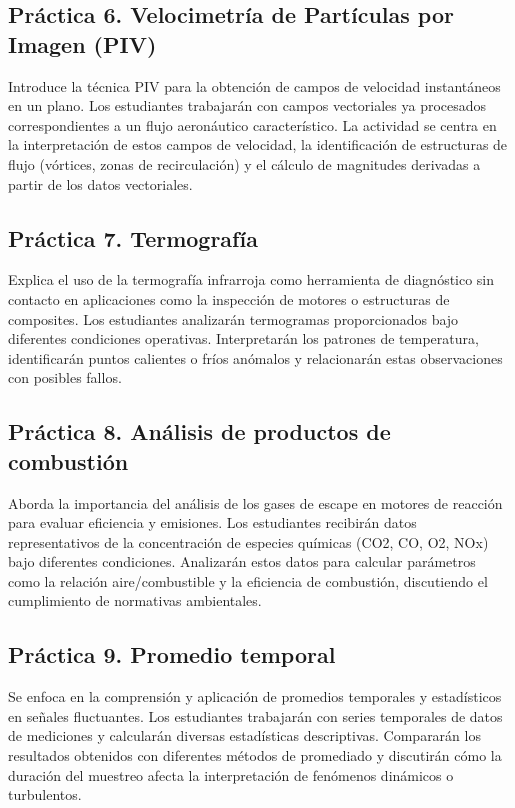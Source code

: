 \documentclass[11pt, a4paper]{article}
\begin{document}
\subsection{Práctica 6. Velocimetría de Partículas por Imagen (PIV)}
Introduce la técnica PIV para la obtención de campos de velocidad instantáneos en un plano. Los estudiantes trabajarán con campos vectoriales ya procesados correspondientes a un flujo aeronáutico característico. La actividad se centra en la interpretación de estos campos de velocidad, la identificación de estructuras de flujo (vórtices, zonas de recirculación) y el cálculo de magnitudes derivadas a partir de los datos vectoriales.

\subsection{Práctica 7. Termografía}
Explica el uso de la termografía infrarroja como herramienta de diagnóstico sin contacto en aplicaciones como la inspección de motores o estructuras de composites. Los estudiantes analizarán termogramas proporcionados bajo diferentes condiciones operativas. Interpretarán los patrones de temperatura, identificarán puntos calientes o fríos anómalos y relacionarán estas observaciones con posibles fallos.

\subsection{Práctica 8. Análisis de productos de combustión}
Aborda la importancia del análisis de los gases de escape en motores de reacción para evaluar eficiencia y emisiones. Los estudiantes recibirán datos representativos de la concentración de especies químicas (CO2, CO, O2, NOx) bajo diferentes condiciones. Analizarán estos datos para calcular parámetros como la relación aire/combustible y la eficiencia de combustión, discutiendo el cumplimiento de normativas ambientales.

\subsection{Práctica 9. Promedio temporal}
Se enfoca en la comprensión y aplicación de promedios temporales y estadísticos en señales fluctuantes. Los estudiantes trabajarán con series temporales de datos de mediciones y calcularán diversas estadísticas descriptivas. Compararán los resultados obtenidos con diferentes métodos de promediado y discutirán cómo la duración del muestreo afecta la interpretación de fenómenos dinámicos o turbulentos.
\end{document}
